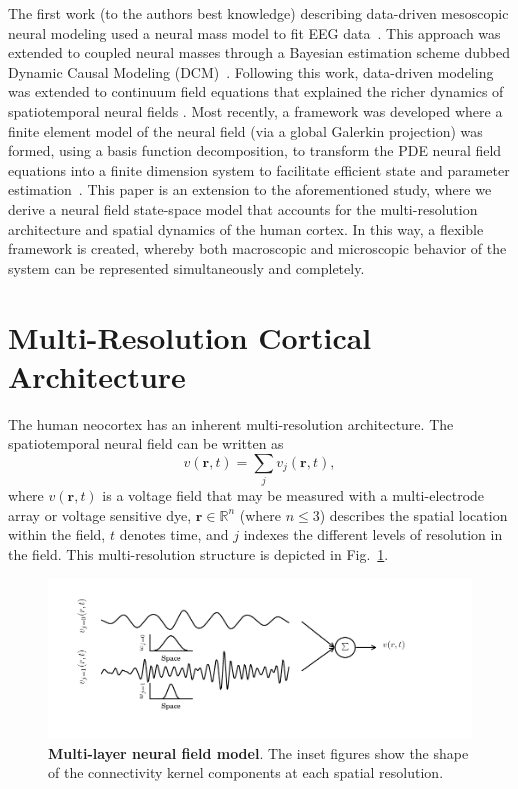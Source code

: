 \documentclass[review,authoryear,3p]{elsarticle}
\begin{document}
The first work (to the authors best knowledge) describing data-driven mesoscopic neural modeling used a neural mass model to fit EEG data~\citep{Valdes1999}. This approach was extended to coupled neural masses through a Bayesian estimation scheme dubbed Dynamic Causal Modeling (DCM)~\citep{David2003}. Following this work, data-driven modeling was extended to continuum field equations that explained the richer dynamics of spatiotemporal neural fields \citep{Galka2008,schiff2008kalman,Daunizeau2009, Pinotsis2011}. Most recently, a framework was developed where a finite element model of the neural field (via a global Galerkin projection) was formed, using a basis function decomposition, to transform the PDE neural field equations into a finite dimension system to facilitate efficient state and parameter estimation~\citep{Freestone2011}. This paper is an extension to the aforementioned study, where we derive a neural field state-space model that accounts for the multi-resolution architecture and spatial dynamics of the human cortex. In this way, a flexible framework is created, whereby both macroscopic and microscopic behavior of the system can be represented simultaneously and completely.

\section{Multi-Resolution Cortical Architecture}
The human neocortex has an inherent multi-resolution architecture. The spatiotemporal neural field can be written as 
\begin{equation}
	v\left(\mathbf{r},t\right) = \sum_{j} v_j\left(\mathbf{r},t\right),
\end{equation}
where $v\left(\mathbf{r},t\right)$ is a voltage field that may be measured with a multi-electrode array or voltage sensitive dye, $\mathbf{r}\in \mathbb{R}^n$ (where $n\le3$) describes the spatial location within the field, $t$ denotes time, and $j$ indexes the different levels of resolution in the field. This multi-resolution structure is depicted in Fig.~\ref{fig:MultiLayerFieldModel}.
\begin{figure}[t]
		\includegraphics[scale=1]{./Graph/fig1.pdf}
	\caption{{\bf Multi-layer neural field model}. The inset figures show the shape of the
connectivity kernel components at each spatial resolution.}
	\label{fig:MultiLayerFieldModel}
\end{figure}
 
\end{document}
